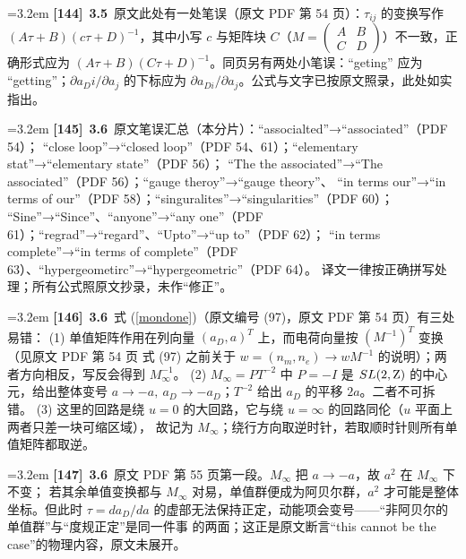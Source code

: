 \par
\par\medskip\noindent\hangindent=3.2em \textbf{[144]}~\textbf{3.5}~原文此处有一处笔误（原文 PDF 第 54 页）：$\tau_{ij}$ 的变换写作 $(A\tau+B)(c\tau+D)^{-1}$，其中小写 $c$ 与矩阵块 $C$（$M=\begin{pmatrix}A&B\\C&D\end{pmatrix}$）不一致，正确形式应为 $(A\tau+B)(C\tau+D)^{-1}$。同页另有两处小笔误：“geting” 应为 “getting”；$\partial a_Di/\partial a_j$ 的下标应为 $\partial a_{Di}/\partial a_j$。公式与文字已按原文照录，此处如实指出。
\par
\par\medskip\noindent\hangindent=3.2em \textbf{[145]}~\textbf{3.6}~原文笔误汇总（本分片）：“associalted”→“associated”（PDF 54）；  “close loop”→“closed loop”（PDF 54、61）；“elementary stat”→“elementary state”（PDF 56）；  “The the associated”→“The associated”（PDF 56）；“gauge theroy”→“gauge theory”、  “in terms our”→“in terms of our”（PDF 58）；“singuralites”→“singularities”（PDF 60）；  “Sine”→“Since”、“anyone”→“any one”（PDF 61）；“regrad”→“regard”、“Upto”→“up to”（PDF 62）；  “in terms complete”→“in terms of complete”（PDF 63）、“hypergeometirc”→“hypergeometric”（PDF 64）。  译文一律按正确拼写处理；所有公式照原文抄录，未作“修正”。
\par
\par\medskip\noindent\hangindent=3.2em \textbf{[146]}~\textbf{3.6}~式 (\ref{mondone})（原文编号 (97)，原文 PDF 第 54 页）有三处易错：  (1) 单值矩阵作用在列向量 $(a_D,a)^T$ 上，而电荷向量按 $(M^{-1})^T$ 变换（见原文 PDF 第 54 页      式 (97) 之前关于 $w=(n_m,n_e)\to wM^{-1}$ 的说明）；两者方向相反，写反会得到 $M_\infty^{-1}$。  (2) $M_\infty=PT^{-2}$ 中 $P=-I$ 是 $SL(2,{\rm Z})$ 的中心元，给出整体变号      $a\to -a,\ a_D\to -a_D$；$T^{-2}$ 给出 $a_D$ 的平移 $2a$。二者不可拆错。  (3) 这里的回路是绕 $u=0$ 的大回路，它与绕 $u=\infty$ 的回路同伦（$u$ 平面上两者只差一块可缩区域），      故记为 $M_\infty$；绕行方向取逆时针，若取顺时针则所有单值矩阵都取逆。
\par
\par\medskip\noindent\hangindent=3.2em \textbf{[147]}~\textbf{3.6}~原文 PDF 第 55 页第一段。$M_\infty$ 把 $a\to -a$，故 $a^2$ 在 $M_\infty$ 下不变；  若其余单值变换都与 $M_\infty$ 对易，单值群便成为阿贝尔群，$a^2$ 才可能是整体坐标。但此时  $\tau=da_D/da$ 的虚部无法保持正定，动能项会变号——“非阿贝尔的单值群”与“度规正定”是同一件事  的两面；这正是原文断言“this cannot be the case”的物理内容，原文未展开。
